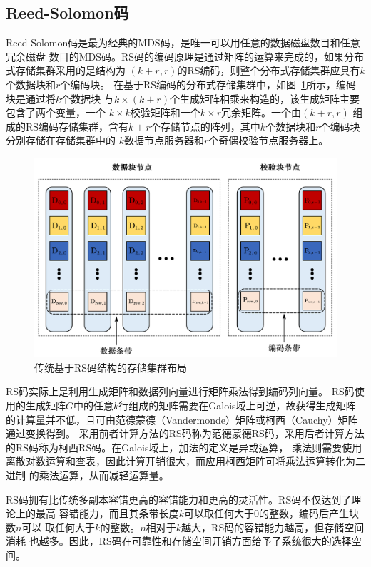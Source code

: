 \subsection{Reed-Solomon码}
Reed-Solomon码\cite{reed1960polynomial}是最为经典的MDS码，是唯一可以用任意的数据磁盘数目和任意冗余磁盘
数目的MDS码。RS码的编码原理是通过矩阵的运算来完成的，如果分布式存储集群采用的是结构为
$(k+r,r)$的RS编码，则整个分布式存储集群应具有$k$个数据块和$r$个编码块。
在基于RS编码的分布式存储集群中，如图~\ref{fig:con-1.3}所示，编码块是通过将$k$个数据块
与$k\times (k+r)$个生成矩阵相乘来构造的，该生成矩阵主要包含了两个变量，一个
$k \times k$校验矩阵和一个$k \times r$冗余矩阵\cite{li2016procode}。一个由$(k+r,r)$
组成的RS编码存储集群，含有$k+r$个存储节点的阵列，其中$k$个数据块和$r$个编码块分别存储在存储集群中的
$k$数据节点服务器和$r$个奇偶校验节点服务器上。

\begin{figure}[htbp]
	\centering
	\includegraphics [scale=0.5]{figures/1.3.pdf}
	\caption{传统基于RS码结构的存储集群布局}
	\label{fig:con-1.3}
\end{figure}

RS码实际上是利用生成矩阵和数据列向量进行矩阵乘法得到编码列向量。
RS码使用的生成矩阵$G$中的任意$k$行组成的矩阵需要在Galois域上可逆，故获得生成矩阵的计算量并不低，且可由范德蒙德（Vandermonde）矩阵或柯西（Cauchy）矩阵\cite{roth1989mds}通过变换得到。
采用前者计算方法的RS码称为范德蒙德RS码，采用后者计算方法的RS码称为柯西RS码。在Galois域上，加法的定义是异或运算，
乘法则需要使用离散对数运算和查表，因此计算开销很大，而应用柯西矩阵可将乘法运算转化为二进制
的乘法运算，从而减轻运算量。

RS码拥有比传统多副本容错更高的容错能力和更高的灵活性。RS码不仅达到了理论上的最高
容错能力，而且其条带长度$k$可以取任何大于0的整数，编码后产生块数$n$可以
取任何大于$k$的整数。$n$相对于$k$越大，RS码的容错能力越高，但存储空间消耗
也越多。因此，RS码在可靠性和存储空间开销方面给予了系统很大的选择空间。

